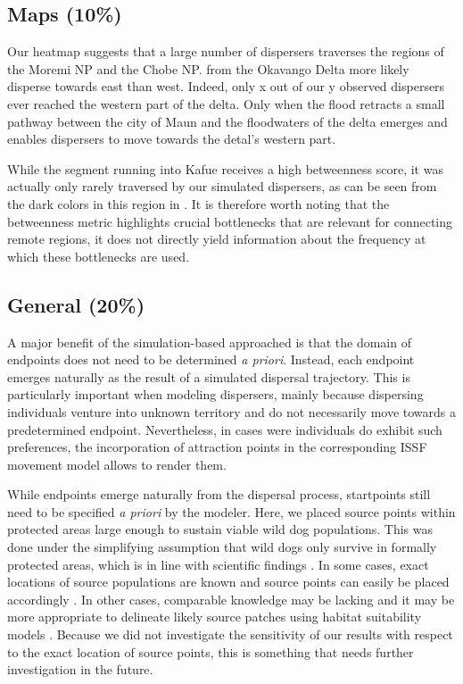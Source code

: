 \documentclass[abstract=on,10pt,a4paper,bibliography=totocnumbered]{article}
\begin{document}
\subsection{Maps (10\%)}
Our heatmap suggests that a large number of dispersers traverses the regions of
the Moremi NP and the Chobe NP. from the Okavango Delta more likely disperse
towards east than west. Indeed, only x out of our y observed dispersers ever
reached the western part of the delta. Only when the flood retracts a small
pathway between the city of Maun and the floodwaters of the delta emerges and
enables dispersers to move towards the detal's western part.

While the segment running into Kafue receives a high betweenness score, it was
actually only rarely traversed by our simulated dispersers, as can be seen from
the dark colors in this region in . It is therefore worth noting
that the betweenness metric highlights crucial bottlenecks that are relevant for
connecting remote regions, it does not directly yield information about the
frequency at which these bottlenecks are used.

\subsection{General (20\%)}
A major benefit of the simulation-based approached is that the domain of
endpoints does not need to be determined \textit{a priori}. Instead, each
endpoint emerges naturally as the result of a simulated dispersal trajectory.
This is particularly important when modeling dispersers, mainly because
dispersing individuals venture into unknown territory and do not necessarily
move towards a predetermined endpoint. Nevertheless, in cases were individuals
do exhibit such preferences, the incorporation of attraction points in the
corresponding ISSF movement model allows to render them.

While endpoints emerge naturally from the dispersal process, startpoints still
need to be specified \textit{a priori} by the modeler. Here, we placed source
points within protected areas large enough to sustain viable wild dog
populations. This was done under the simplifying assumption that wild dogs only
survive in formally protected areas, which is in line with scientific findings
\citep{Woodroffe.1999, Woodroffe.2012, VanDerMeer.2014, Loveridge.2019}. In some
cases, exact locations of source populations are known and source points can
easily be placed accordingly \citep{Kanagaraj.2013}. In other cases, comparable
knowledge may be lacking and it may be more appropriate to delineate likely
source patches using habitat suitability models \citep{Squires.2013}. Because we
did not investigate the sensitivity of our results with respect to the exact
location of source points, this is something that needs further investigation in
the future.
\end{document}
